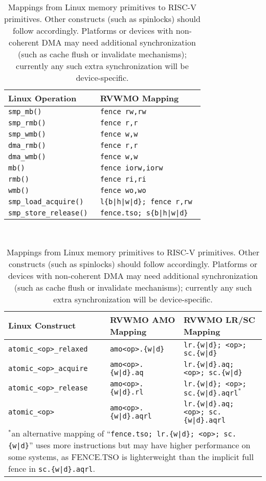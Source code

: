 \begin{table}[h!]
  \centering
  \begin{tabular}{|l|l|}
    \hline
    Linux Operation           & RVWMO Mapping \\
    \hline
    \hline
    \tt smp\_mb()             & \tt fence rw,rw \\
    \hline
    \tt smp\_rmb()            & \tt fence r,r \\
    \hline
    \tt smp\_wmb()            & \tt fence w,w \\
    \hline
    \tt dma\_rmb()            & \tt fence r,r \\
    \hline
    \tt dma\_wmb()            & \tt fence w,w \\
    \hline
    \tt mb()                  & \tt fence iorw,iorw \\
    \hline
    \tt rmb()                 & \tt fence ri,ri \\
    \hline
    \tt wmb()                 & \tt fence wo,wo \\
    \hline
    \tt smp\_load\_acquire()   & \tt l\{b|h|w|d\}; fence r,rw \\
    \hline
    \tt smp\_store\_release()  & \tt fence.tso; s\{b|h|w|d\}  \\
    \hline
  \end{tabular}

  ~

  \begin{tabular}{|l|l|l|}
    \hline
    Linux Construct            & RVWMO AMO Mapping       & RVWMO LR/SC Mapping\\
    \hline
    \tt atomic\_<op>\_relaxed  & \tt amo<op>.\{w|d\}      & \tt lr.\{w|d\}; <op>; sc.\{w|d\} \\
    \hline
    \tt atomic\_<op>\_acquire  & \tt amo<op>.\{w|d\}.aq   & \tt lr.\{w|d\}.aq; <op>; sc.\{w|d\} \\
    \hline
    \tt atomic\_<op>\_release  & \tt amo<op>.\{w|d\}.rl   & \tt lr.\{w|d\}; <op>; sc.\{w|d\}.aqrl$^*$ \\
    \hline
    \tt atomic\_<op>           & \tt amo<op>.\{w|d\}.aqrl & \tt lr.\{w|d\}.aq; <op>; sc.\{w|d\}.aqrl \\
    \hline
    \multicolumn{3}{p{0.9\textwidth}}{$^*$an alternative mapping of ``{\tt fence.tso;~lr.\{w|d\};~<op>;~sc.\{w|d\}}'' uses more instructions but may have higher performance on some systems, as FENCE.TSO is lighterweight than the implicit full fence in {\tt sc.\{w|d\}.aqrl}.}
  \end{tabular}
  \caption{Mappings from Linux memory primitives to RISC-V primitives.  Other constructs (such as spinlocks) should follow accordingly.  Platforms or devices with non-coherent DMA may need additional synchronization (such as cache flush or invalidate mechanisms); currently any such extra synchronization will be device-specific.}
  \label{tab:linuxmappings}
\end{table}

